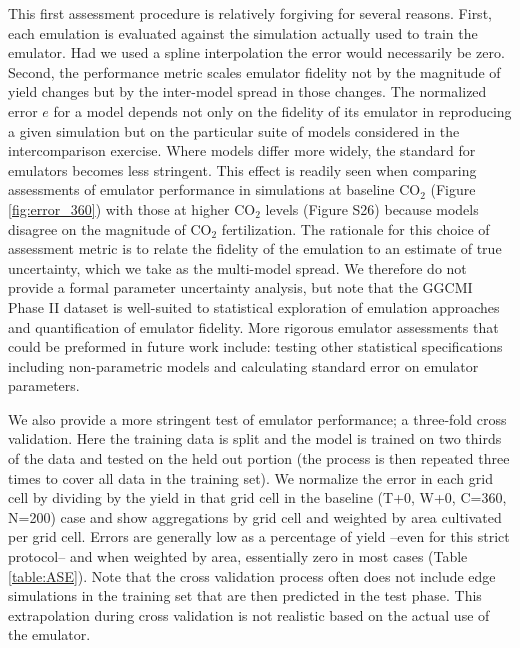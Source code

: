 \documentclass[gmd, manuscript]{copernicus} %
\begin{document}
This first assessment procedure is relatively forgiving for several reasons. First, each emulation is evaluated against the simulation actually used to train the emulator. Had we used a spline interpolation the error would necessarily be zero. Second, the performance metric scales emulator fidelity not by the magnitude of yield changes but by the inter-model spread in those changes. The normalized error $e$ for a model depends not only on the fidelity of its emulator in reproducing a given simulation but on the particular suite of models considered in the intercomparison exercise. Where models differ more widely, the standard for emulators becomes less stringent. This effect is readily seen when comparing assessments of emulator performance in simulations at baseline CO$_2$ (Figure \ref{fig:error_360}) with those at higher CO$_2$ levels (Figure S26) because models disagree on the magnitude of CO$_2$ fertilization. The rationale for this choice of assessment metric is to relate the fidelity of the emulation to an estimate of true uncertainty, which we take as the multi-model spread. We therefore do not provide a formal parameter uncertainty analysis, but note that the GGCMI Phase II dataset is well-suited to statistical exploration of emulation approaches and quantification of emulator fidelity. More rigorous emulator assessments that could be preformed in future work include: testing other statistical specifications including non-parametric models and calculating standard error on emulator parameters.

We also provide a more stringent test of emulator performance; a three-fold cross validation. Here the training data is split and the model is trained on two thirds of the data and tested on the held out portion (the process is then repeated three times to cover all data in the training set). We normalize the error in each grid cell by dividing by the yield in that grid cell in the baseline (T+0, W+0, C=360, N=200) case and show aggregations by grid cell and weighted by area cultivated per grid cell. Errors are generally low as a percentage of yield --even for this strict protocol-- and when weighted by area, essentially zero in most cases (Table \ref{table:ASE}). Note that the cross validation process often does not include edge simulations in the training set that are then predicted in the test phase. This extrapolation during cross validation is not realistic based on the actual use of the emulator.
\end{document}
